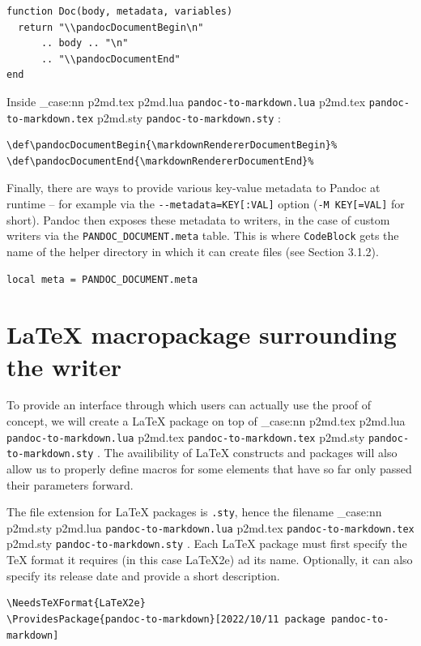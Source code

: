 \documentclass[
  digital,     %
  oneside,     %
  nosansbold,  %
  nocolorbold, %
  lof,         %
  nolot,       %
]{fithesis4}
\newcommand\file[1]
  {
    \str_case:nn
      { #1 }
      {
        { p2md.lua } { \texttt{pandoc\hyp{}to\hyp{}markdown.lua} }
        { p2md.tex } { \texttt{pandoc\hyp{}to\hyp{}markdown.tex} }
        { p2md.sty } { \texttt{pandoc\hyp{}to\hyp{}markdown.sty} }
      }
  }
\begin{document}
\noindent
\lstset{language=[5.3]Lua}
\begin{lstlisting}
function Doc(body, metadata, variables)
  return "\\pandocDocumentBegin\n"
      .. body .. "\n"
      .. "\\pandocDocumentEnd"
end
\end{lstlisting}

\noindent
Inside \file{p2md.tex}:

\noindent
\lstset{language=[plain]TeX}
\begin{lstlisting}
\def\pandocDocumentBegin{\markdownRendererDocumentBegin}%
\def\pandocDocumentEnd{\markdownRendererDocumentEnd}%
\end{lstlisting}

\noindent
Finally, there are ways to provide various key-value metadata to Pandoc at runtime -- for example via the \texttt{-{}-metadata=KEY[:VAL]} option (\texttt{-M KEY[=VAL]} for short). Pandoc then exposes these metadata to writers, in the case of custom writers via the \texttt{PANDOC\_DOCUMENT.meta} table. This is where \texttt{CodeBlock} gets the name of the helper directory in which it can create files (see Section 3.1.2).

\noindent
\lstset{language=[5.3]Lua}
\begin{lstlisting}
local meta = PANDOC_DOCUMENT.meta
\end{lstlisting}

\section{\LaTeX{} macropackage surrounding the writer}
To provide an interface through which users can actually use the proof of concept, we will create a \LaTeX{} package on top of \file{p2md.tex}. The availibility of \LaTeX{} constructs and packages will also allow us to properly define macros for some elements that have so far only passed their parameters forward.

The file extension for \LaTeX{} packages is \texttt{.sty}, hence the filename \file{p2md.sty}.
Each \LaTeX{} package must first specify the \TeX{} format it requires (in this case \LaTeX{}2e) ad its name. Optionally, it can also specify its release date and provide a short description.

\noindent
\lstset{language=[LaTeX]TeX}
\begin{lstlisting}
\NeedsTeXFormat{LaTeX2e}
\ProvidesPackage{pandoc-to-markdown}[2022/10/11 package pandoc-to-markdown]
\end{lstlisting}
\end{document}
